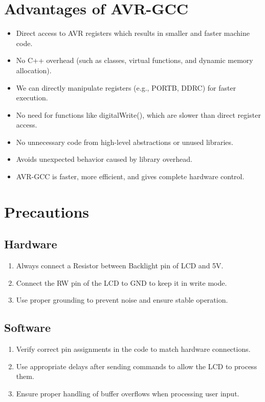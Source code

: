 \documentclass[journal]{IEEEtran}
\begin{document}
\section{Advantages of AVR-GCC}
\begin{itemize}
    \item Direct access to AVR registers which results in smaller and faster machine code.
    \item No C++ overhead (such as classes, virtual functions, and dynamic memory allocation).
    \item We can directly manipulate registers (e.g., PORTB, DDRC) for faster execution.
    \item No need for functions like digitalWrite(), which are slower than direct register access.
    \item No unnecessary code from high-level abstractions or unused libraries.
    \item Avoids unexpected behavior caused by library overhead.
    \item AVR-GCC is faster, more efficient, and gives complete hardware control. 
\end{itemize}

\section{Precautions}
\subsection{Hardware}
\begin{enumerate}
    \item Always connect a Resistor between Backlight pin of LCD and 5V.
    \item Connect the RW pin of the LCD to GND to keep it in write mode.
    \item Use proper grounding to prevent noise and ensure stable operation.
\end{enumerate}

\subsection{Software}
\begin{enumerate}
    \item Verify correct pin assignments in the code to match hardware connections.
    \item Use appropriate delays after sending commands to allow the LCD to process them.
    \item Ensure proper handling of buffer overflows when processing user input.
\end{enumerate}
\end{document}
